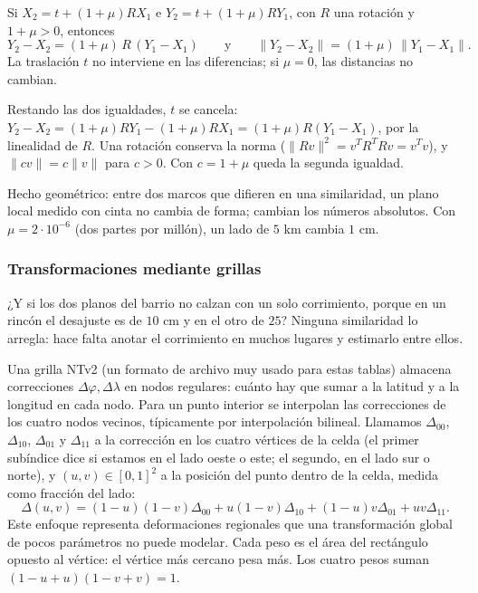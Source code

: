 \begin{proposicion}\label{prop:siete-distancias}
Si \(X_2=t+(1+\mu)RX_1\) e \(Y_2=t+(1+\mu)RY_1\), con \(R\) una rotación y \(1+\mu>0\), entonces
\[
  Y_2-X_2=(1+\mu)\,R\,(Y_1-X_1)
  \qquad\text{y}\qquad
  \lVert Y_2-X_2\rVert=(1+\mu)\,\lVert Y_1-X_1\rVert .
\]
La traslación \(t\) no interviene en las diferencias; si \(\mu=0\), las distancias no cambian.
\end{proposicion}

\begin{demostracion}
Restando las dos igualdades, \(t\) se cancela:
\(Y_2-X_2=(1+\mu)RY_1-(1+\mu)RX_1=(1+\mu)R(Y_1-X_1)\), por la linealidad de \(R\). Una rotación
conserva la norma (\(\lVert Rv\rVert^2=v^TR^TRv=v^Tv\)), y \(\lVert cv\rVert=c\lVert v\rVert\)
para \(c>0\). Con \(c=1+\mu\) queda la segunda igualdad.
\end{demostracion}

Hecho geométrico: entre dos marcos que difieren en una similaridad, un plano local medido con
cinta no cambia de forma; cambian los números absolutos. Con \(\mu=2\cdot10^{-6}\) (dos partes
por millón), un lado de \(5\) km cambia \(1\) cm.


\subsubsection{Transformaciones mediante grillas}\label{sec:grillas-bilineal}

¿Y si los dos planos del barrio no calzan con un solo corrimiento, porque en un rincón el
desajuste es de \(10\) cm y en el otro de \(25\)? Ninguna similaridad lo arregla: hace falta
anotar el corrimiento en muchos lugares y estimarlo entre ellos.

Una grilla NTv2 (un formato de archivo muy usado para estas tablas) almacena correcciones
\(\Delta\varphi,\Delta\lambda\) en nodos regulares: cuánto hay que sumar a la latitud y a la
longitud en cada nodo. Para un punto interior se interpolan las correcciones de los cuatro
nodos vecinos, típicamente por interpolación bilineal. Llamamos \(\Delta_{00}\),
\(\Delta_{10}\), \(\Delta_{01}\) y \(\Delta_{11}\) a la corrección en los cuatro vértices de la
celda (el primer subíndice dice si estamos en el lado oeste o este; el segundo, en el lado sur
o norte), y \((u,v)\in[0,1]^2\) a la posición del punto dentro de la celda, medida como
fracción del lado:
\[
\Delta(u,v)=
(1-u)(1-v)\Delta_{00}
+u(1-v)\Delta_{10}
+(1-u)v\Delta_{01}
+uv\Delta_{11}.
\]
Este enfoque representa deformaciones regionales que una transformación global de pocos
parámetros no puede modelar. Cada peso es el área del rectángulo opuesto al vértice: el
vértice más cercano pesa más. Los cuatro pesos suman \((1-u+u)(1-v+v)=1\).

